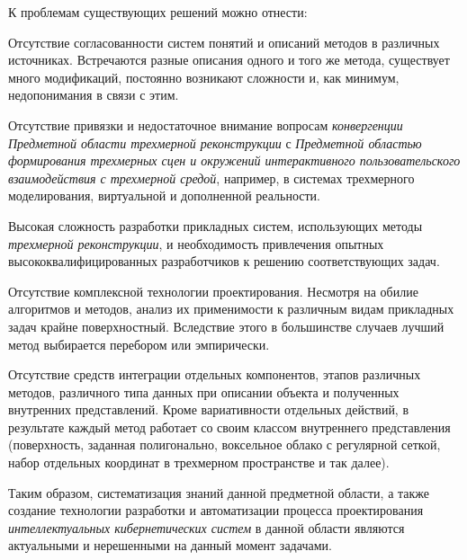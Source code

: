 К проблемам существующих решений можно отнести:
\begin{textitemize}
    \item Отсутствие согласованности систем понятий и описаний методов в различных источниках. Встречаются разные описания одного и того же метода, существует много модификаций, постоянно возникают сложности и, как минимум, недопонимания в связи с этим.
    \item Отсутствие привязки и недостаточное внимание вопросам \textit{конвергенции} \textit{Предметной области трехмерной реконструкции} с \textit{Предметной областью формирования трехмерных сцен и окружений интерактивного пользовательского взаимодействия с трехмерной средой}, например, в системах трехмерного моделирования, виртуальной и дополненной реальности.
    \item Высокая сложность разработки прикладных систем, использующих методы \textit{трехмерной реконструкции}, и необходимость привлечения опытных высококвалифицированных разработчиков к решению соответствующих задач.
    \item Отсутствие комплексной технологии проектирования. Несмотря на обилие алгоритмов и методов, анализ их применимости к различным видам прикладных задач крайне поверхностный. Вследствие этого в большинстве случаев лучший метод выбирается перебором или эмпирически.
    \item Отсутствие средств интеграции отдельных компонентов, этапов различных методов, различного типа данных при описании объекта и полученных внутренних представлений. Кроме вариативности отдельных действий, в результате каждый метод работает со своим классом внутреннего представления (поверхность, заданная полигонально, воксельное облако с регулярной сеткой, набор отдельных координат в трехмерном пространстве и так далее).
\end{textitemize}

Таким образом, систематизация знаний данной предметной области, а также создание технологии разработки и автоматизации процесса проектирования \textit{интеллектуальных кибернетических систем} в данной области являются актуальными и нерешенными на данный момент задачами.

